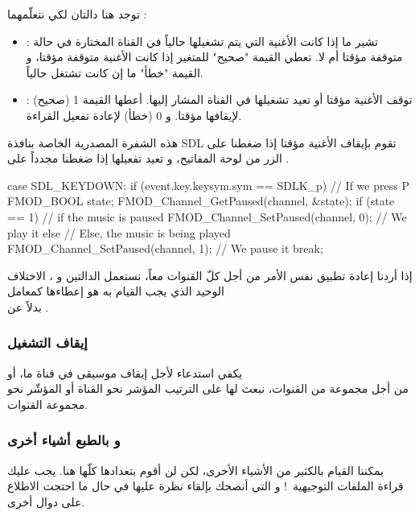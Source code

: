 توجد هنا دالتان لكي نتعلّمهما :

\begin{itemize}
	\item {} :
	تشير ما إذا كانت الأغنية التي يتم تشغيلها حالياً في القناة المختارة في حالة متوقفة مؤقتا أم لا. تعطي القيمة "صحيح" للمتغير 
	إذا كانت الأغنية متوقفة مؤقتا، و القيمة "خطأ" ما إن كانت تشتغل حالياً.
	\item {} :
	توقف الأغنية مؤقتا أو تعيد تشغيلها في القناة المشار إليها. أعطها القيمة 1 (صحيح) لإيقافها مؤقتا. و 0 (خطأ) لإعادة تفعيل القراءة.
\end{itemize}

هذه الشفرة المصدرية الخاصة بنافذة
\textenglish{SDL}
تقوم بإيقاف الأغنية مؤقتا إذا ضغطنا على الزر
من لوحة المفاتيح، و تعيد تفعيلها إذا ضغطنا مجدداً على
.

\begin{Csource}
case SDL_KEYDOWN:
if (event.key.keysym.sym == SDLK_p) // If we press P
{
	FMOD_BOOL state;
	FMOD_Channel_GetPaused(channel, &state);
	if (state == 1) // if the music is paused
		FMOD_Channel_SetPaused(channel, 0); // We play it
	else // Else, the music is being played
		FMOD_Channel_SetPaused(channel, 1); // We pause it
}
break;
\end{Csource}

 إذا أردنا إعادة تطبيق نفس الأمر من أجل كلّ القنوات معاً، نستعمل الدالتين
 و
،
الاختلاف الوحيد الذي يجب القيام به هو إعطاءها كمعامل\\
بدلاً عن 
.

\subsubsection{إيقاف التشغيل}

يكفي استدعاء
لأجل إيقاف موسيقى في قناة ما، أو\\
من أجل مجموعة من القنوات، نبعث لها على الترتيب المؤشر نحو القناة أو المؤشّر نحو مجموعة القنوات.

\subsubsection{و بالطبع أشياء أخرى}

يمكننا القيام بالكثير من الأشياء الأخرى، لكن لن أقوم بتعدادها كلّها هنا. يجب عليك قراءة الملفات التوجيهية~! و التي أنصحك بإلقاء نظرة عليها في حال ما احتجت الاطلاع على دوال أخرى.


